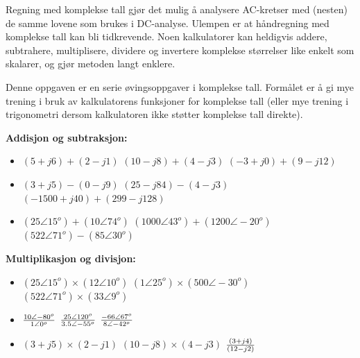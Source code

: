 

Regning med komplekse tall gjør det mulig å analysere AC-kretser med (nesten) de samme lovene som brukes i DC-analyse. Ulempen er at håndregning med komplekse tall kan bli tidkrevende. Noen kalkulatorer kan heldigvis addere, subtrahere, multiplisere, dividere og invertere komplekse størrelser like enkelt som skalarer, og gjør metoden langt enklere.

Denne oppgaven er en serie øvingsoppgaver i komplekse tall. Formålet er å gi mye trening i bruk av kalkulatorens funksjoner for komplekse tall (eller mye trening i trigonometri dersom kalkulatoren ikke støtter komplekse tall direkte).

\vskip 10pt

\noindent
{\bf Addisjon og subtraksjon:}

\begin{itemize}
\item{} $(5 + j6) + (2 - j1)$ \hskip 15pt $(10 - j8) + (4 - j3)$ \hskip 15pt $(-3 + j0) + (9 - j12)$
\item{} $(3 + j5) - (0 - j9)$ \hskip 15pt $(25 - j84) - (4 - j3)$ \hskip 15pt $(-1500 + j40) + (299 - j128)$
\item{} $(25 \angle 15^o) + (10 \angle 74^o)$ \hskip 15pt $(1000 \angle 43^o) + (1200 \angle -20^o)$ \hskip 15pt $(522 \angle 71^o) - (85 \angle 30^o)$
\end{itemize}

\vskip 10pt

\noindent
{\bf Multiplikasjon og divisjon:}

\begin{itemize}
\item{} $(25 \angle 15^o) \times (12 \angle 10^o)$ \hskip 15pt $(1 \angle 25^o) \times (500 \angle -30^o)$ \hskip 15pt $(522 \angle 71^o) \times (33 \angle 9^o)$
\item{} ${{10 \angle -80^o} \over {1 \angle 0^o}}$ \hskip 15pt ${{25 \angle 120^o} \over {3.5 \angle -55^o}}$ \hskip 15pt ${{-66 \angle 67^o} \over {8 \angle -42^o}}$
\item{} $(3 + j5) \times (2 - j1)$ \hskip 15pt $(10 - j8) \times (4 - j3)$ \hskip 15pt ${(3 + j4) \over (12 - j2)}$
\end{itemize}

\vskip 10pt


